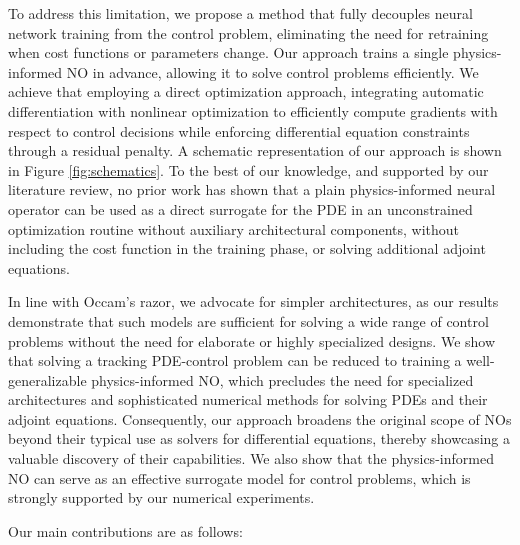 \documentclass[final,1p,times]{elsarticle}
\theoremstyle{plain} %
\theoremstyle{definition} %
\theoremstyle{remark} %
\begin{document}
To address this limitation, we propose a method that fully decouples neural network training from the control problem, eliminating the need for retraining when cost functions or parameters change. Our approach trains a single physics-informed NO in advance, allowing it to solve control problems efficiently. We achieve that employing a direct optimization approach, integrating automatic differentiation with nonlinear optimization to efficiently compute gradients with respect to control decisions while enforcing differential equation constraints through a residual penalty. A schematic representation of our approach is shown in Figure \ref{fig:schematics}. To the best of our knowledge, and supported by our literature review, no prior work has shown that a plain physics-informed neural operator can be used as a direct surrogate for the PDE in an unconstrained optimization routine without auxiliary architectural components, without including the cost function in the training phase, or solving additional adjoint equations. 

In line with Occam’s razor, we advocate for simpler architectures, as our results demonstrate that such models are sufficient for solving a wide range of control problems without the need for elaborate or highly specialized designs. We show that solving a tracking PDE-control problem can be reduced to training a well-generalizable physics-informed NO, which precludes the need for specialized architectures and sophisticated numerical methods for solving PDEs and their adjoint equations. Consequently, our approach broadens the original scope of NOs beyond their typical use as solvers for differential equations, thereby showcasing a valuable discovery of their capabilities. We also show that the physics-informed NO can serve as an effective surrogate model for control problems, which is strongly supported by our numerical experiments. 

Our main contributions are as follows:
\end{document}

